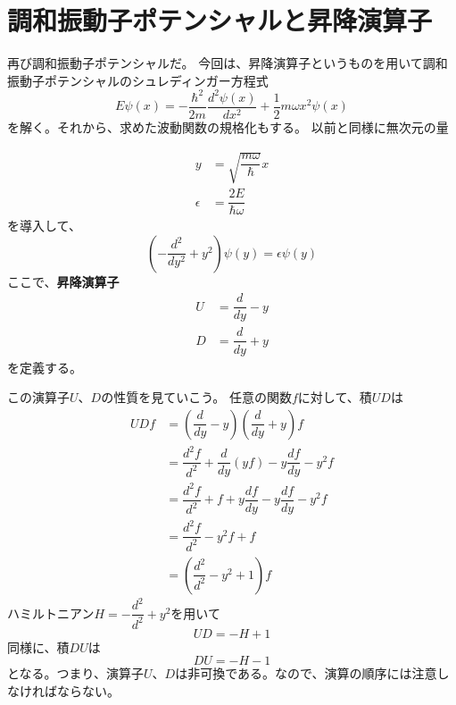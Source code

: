 
\section{調和振動子ポテンシャルと昇降演算子}
再び調和振動子ポテンシャルだ。
今回は、昇降演算子というものを用いて調和振動子ポテンシャルのシュレディンガー方程式
\begin{equation}
  \label{harmony_schrodinger_eq}
  E\psi(x) = - \dfrac{\hbar^2}{2m} \dfrac{d^2 \psi(x)}{d x^2} + \dfrac{1}{2}m\omega x^2\psi(x)
\end{equation}
を解く。それから、求めた波動関数の規格化もする。
以前と同様に無次元の量

\begin{align}
  \label{y}
  y &= \sqrt{\dfrac{m\omega}{\hbar}}x \\
  \label{eps}
  \epsilon &= \dfrac{2E}{\hbar\omega}
\end{align}
を導入して、
\begin{equation}
  \label{harmony_DE}
  \left( -\dfrac{d^2}{d y^2} + y^2 \right) \psi(y) = \epsilon\psi(y)
\end{equation}
ここで、{\bf 昇降演算子}
\begin{align}
  \label{U}
  U &= \dfrac{d}{dy} - y \\
  \label{D}
  D &= \dfrac{d}{dy} + y
\end{align}
を定義する。

この演算子$U、D$の性質を見ていこう。
任意の関数$f$に対して、積$UD$は
\begin{align}
  UDf &= \left( \dfrac{d}{dy} - y \right)\left( \dfrac{d}{dy} + y \right)f \\
  &= \dfrac{d^2f}{d^2} + \dfrac{d}{dy}(yf) - y\dfrac{df}{dy} - y^2 f \\
  &= \dfrac{d^2f}{d^2} + f +  y\dfrac{df}{dy} - y\dfrac{df}{dy} - y^2 f \\
  &= \dfrac{d^2f}{d^2} -y^2 f + f \\
  &= \left( \dfrac{d^2}{d^2} -y^2 + 1\right)f
\end{align}
ハミルトニアン$H = -\dfrac{d^2}{d^2} + y^2$を用いて
\begin{equation}
  \label{UD}
  UD = -H + 1
\end{equation}
同様に、積$DU$は
\begin{equation}
  \label{DU}
  DU = -H - 1
\end{equation}
となる。つまり、演算子$U、D$は非可換である。なので、演算の順序には注意しなければならない。

